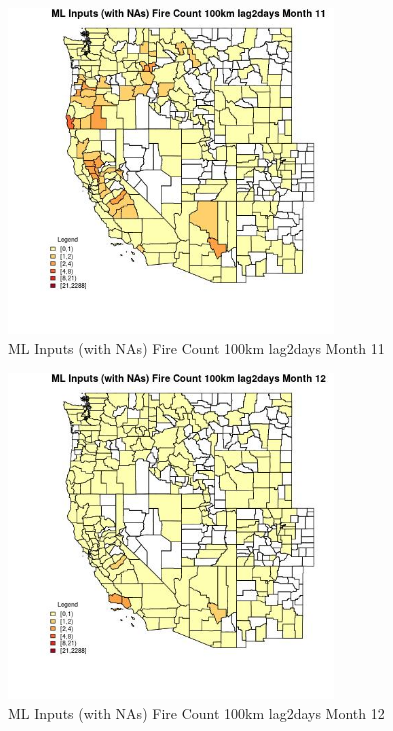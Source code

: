 \clearpage 

\begin{figure} 
\centering  
\includegraphics[width=0.77\textwidth]{Code_Outputs/Report_ML_input_PM25_Step4_part_e_de_duplicated_aves_compiled_2019-05-21wNAs_CountyFire_Count_100km_lag2daysmedianMonth11.jpg} 
\caption{\label{fig:Report_ML_input_PM25_Step4_part_e_de_duplicated_aves_compiled_2019-05-21wNAsCountyFire_Count_100km_lag2daysmedianMonth11}ML Inputs (with NAs) Fire Count 100km lag2days Month 11} 
\end{figure} 
 

\begin{figure} 
\centering  
\includegraphics[width=0.77\textwidth]{Code_Outputs/Report_ML_input_PM25_Step4_part_e_de_duplicated_aves_compiled_2019-05-21wNAs_CountyFire_Count_100km_lag2daysmedianMonth12.jpg} 
\caption{\label{fig:Report_ML_input_PM25_Step4_part_e_de_duplicated_aves_compiled_2019-05-21wNAsCountyFire_Count_100km_lag2daysmedianMonth12}ML Inputs (with NAs) Fire Count 100km lag2days Month 12} 
\end{figure} 
 

